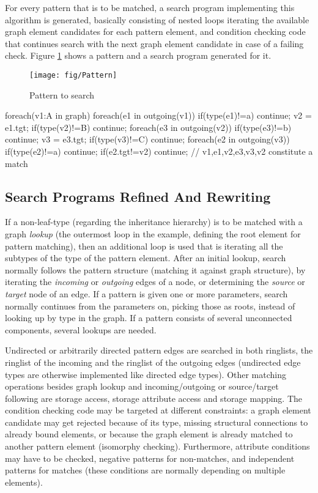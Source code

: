 For every pattern that is to be matched, a search program implementing this algorithm is generated, basically consisting of nested loops iterating the available graph element candidates for each pattern element, and condition checking code that continues search with the next graph element candidate in case of a failing check.
Figure \ref{figpatterntosearchfirst} shows a pattern and a search program generated for it.

\begin{figure}[htbp]
  \centering
  \texttt{[image: fig/Pattern]}
  \caption{Pattern to search}
  \label{figpatterntosearchfirst}
\end{figure}

\begin{csharp}
foreach(v1:A in graph) {
	foreach(e1 in outgoing(v1)) {
		if(type(e1)!=a) continue;
		v2 = e1.tgt;
		if(type(v2)!=B) continue;
		foreach(e3 in outgoing(v2)) {
			if(type(e3)!=b) continue;
			v3 = e3.tgt;
			if(type(v3)!=C) continue;
			foreach(e2 in outgoing(v3)) {
				if(type(e2)!=a) continue;
				if(e2.tgt!=v2) continue;
				// v1,e1,v2,e3,v3,v2 constitute a match
			} 
		}
	}
}
\end{csharp}

\pagebreak

\subsection*{Search Programs Refined And Rewriting} %

If a non-leaf-type (regarding the inheritance hierarchy) is to be matched with a graph \emph{lookup} (the outermost loop in the example, defining the root element for pattern matching), then an additional loop is used that is iterating all the subtypes of the type of the pattern element.
After an initial lookup, search normally follows the pattern structure (matching it against graph structure), by iterating the \emph{incoming} or \emph{outgoing} edges of a node, or determining the \emph{source} or \emph{target} node of an edge.
If a pattern is given one or more parameters, search normally continues from the parameters on, picking those as roots, instead of looking up by type in the graph.
If a pattern consists of several unconnected components, several lookups are needed.

Undirected or arbitrarily directed pattern edges are searched in both ringlists, the ringlist of the incoming and the ringlist of the outgoing edges (undirected edge types are otherwise implemented like directed edge types).
Other matching operations besides graph lookup and incoming/outgoing or source/target following are storage access, storage attribute access and storage mapping.
The condition checking code may be targeted at different constraints:
a graph element candidate may get rejected because of its type, missing structural connections to already bound elements, or because the graph element is already matched to another pattern element (isomorphy checking).
Furthermore, attribute conditions may have to be checked, negative patterns for non-matches, and independent patterns for matches (these conditions are normally depending on multiple elements).

